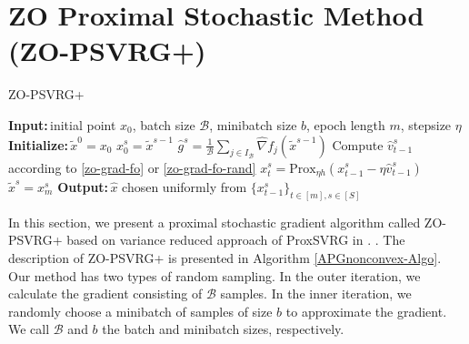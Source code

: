 \documentclass{article}
\newcommand*{\Po}{\text{Prox}}
\newcommand{\Initialize}{\textbf{Initialize:}{\,}}
\newcommand{\Input}{\textbf{Input:}{\,}}
\newcommand{\Output}{\textbf{Output:}{\,}}
\theoremstyle{definition}
\theoremstyle{remark}
\begin{document}
\section{ZO Proximal Stochastic Method (ZO-PSVRG+)}
\begin{algorithm}\label{APGnonconvex-Algo}
\caption{ZO-PSVRG+}
\begin{algorithmic}[1]
\State\Input initial point $x_0$, batch size $\mathcal{B}$, minibatch size $b$, epoch length $m$, stepsize $\eta$
\State\Initialize $\tilde{x}^0 = x_0$
\State $x_0^s = \tilde{x}^{s-1}$
\State $\hat{g}^s = \frac{1}{\mathcal{B}} \sum_{j\in I_{\mathcal{B}}} \hat{\nabla} f_j (\tilde{x}^{s-1})$
\State Compute ${\hat{v}}_{t-1}^s$ according to \eqref{zo-grad-fo} or \eqref{zo-grad-fo-rand}
\State $x_{t}^s= \Po_{\eta h}(x_{t-1}^s - \eta \hat{v}_{t-1}^s)$
\EndFor
\State $\tilde{x}^{s} = x_m^s$
 \EndFor
 \State\Output $\hat{x}$ chosen uniformly from $\{x_{t-1}^s\}_{t\in [m], s\in [S]}$
\end{algorithmic}
\end{algorithm}
In this section, we present a proximal stochastic gradient algorithm called ZO-PSVRG+ based on variance reduced approach of ProxSVRG in \cite{xiao2014proximal,reddi2016proximal,li2018simple}.
. The description of ZO-PSVRG+ is presented in Algorithm \ref{APGnonconvex-Algo}.
Our method has two types of random sampling. In the outer iteration,
we calculate the gradient consisting of $\mathcal{B}$ samples. In the inner iteration, we randomly  choose a minibatch of samples of size $b$ to approximate the gradient.
 We call $\mathcal{B}$ and $b$  the batch and  minibatch sizes, respectively.
\end{document}
